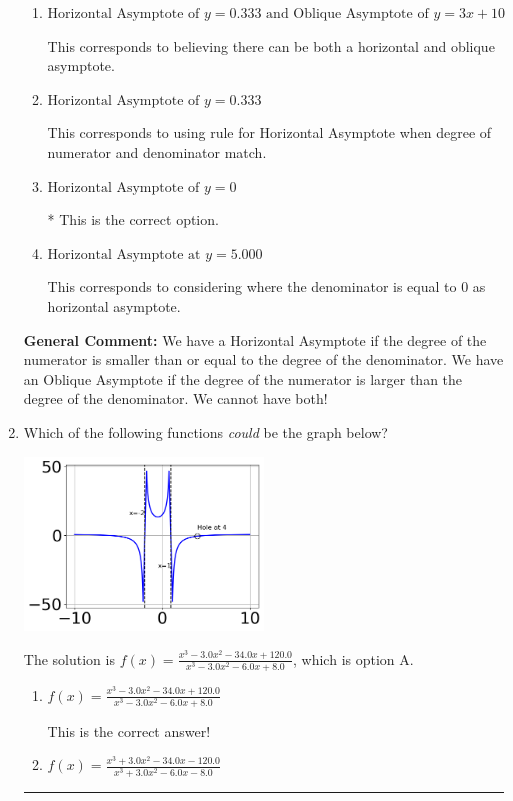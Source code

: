 \documentclass{extbook}[14pt]
\newcommand{\litem}[1]{\item #1

\rule{\textwidth}{0.4pt}}
\begin{document}
\begin{enumerate}
{\begin{enumerate}[label=\Alph*.]
This corresponds to flipping the numerator and denominator, then using synthetic division to find the oblique asymptote.
\item \( \text{Horizontal Asymptote of } y = 0.333 \text{ and Oblique Asymptote of } y = 3x + 10 \)

This corresponds to believing there can be both a horizontal and oblique asymptote.
\item \( \text{Horizontal Asymptote of } y = 0.333  \)

This corresponds to using rule for Horizontal Asymptote when degree of numerator and denominator match.
\item \( \text{Horizontal Asymptote of } y = 0 \)

* This is the correct option.
\item \( \text{Horizontal Asymptote at } y = 5.000 \)

This corresponds to considering where the denominator is equal to 0 as horizontal asymptote.
\end{enumerate}

\textbf{General Comment:} We have a Horizontal Asymptote if the degree of the numerator is smaller than or equal to the degree of the denominator. We have an Oblique Asymptote if the degree of the numerator is larger than the degree of the denominator. We cannot have both!
}
\litem{
Which of the following functions \textit{could} be the graph below?

\begin{center}
    \includegraphics[width=0.5\textwidth]{../Figures/identifyGraphOfRationalFunctionC.png}
\end{center}


The solution is \( f(x)=\frac{x^{3} -3.0 x^{2} -34.0 x + 120.0}{x^{3} -3.0 x^{2} -6.0 x + 8.0} \), which is option A.\begin{enumerate}[label=\Alph*.]
\item \( f(x)=\frac{x^{3} -3.0 x^{2} -34.0 x + 120.0}{x^{3} -3.0 x^{2} -6.0 x + 8.0} \)

This is the correct answer!
\item \( f(x)=\frac{x^{3} +3.0 x^{2} -34.0 x -120.0}{x^{3} +3.0 x^{2} -6.0 x -8.0} \)


\end{enumerate}}
\end{enumerate}
\end{document}
